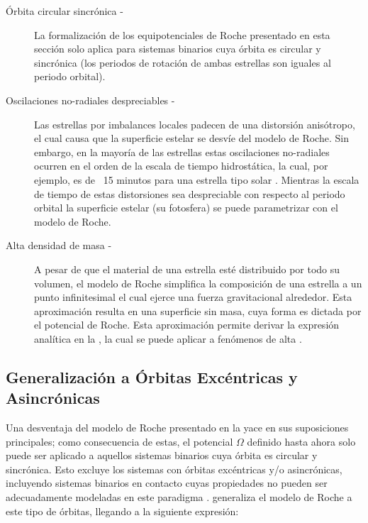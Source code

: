\begin{description}
	\item[Órbita circular sincrónica -] La formalización de los equipotenciales
	de Roche presentado en esta sección solo aplica para sistemas binarios cuya
	órbita es circular y sincrónica (los periodos de rotación de ambas estrellas
	son iguales al periodo orbital). 
	
	
	\item[Oscilaciones no-radiales despreciables -]  Las estrellas por
	imbalances locales padecen de una distorsión anisótropo, el cual causa que
	la superficie estelar se desvíe del modelo de Roche. Sin embargo, en la
	mayoría de las estrellas estas oscilaciones no-radiales ocurren en el orden
	de la escala de tiempo hidrostática, la cual, por ejemplo, es de ~15 minutos
	para una estrella tipo solar
	. Mientras
	la escala de tiempo de estas distorsiones sea despreciable con respecto al
	periodo orbital la superficie estelar (su fotosfera) se puede parametrizar
	con el modelo de Roche.

	\item[Alta densidad de masa -] A pesar de que el material de una estrella
	esté distribuido por todo su volumen, el modelo de Roche simplifica la
	composición de una estrella a un punto infinitesimal el cual ejerce una
	fuerza gravitacional alrededor. Esta aproximación resulta en una superficie
	sin masa, cuya forma es dictada por el potencial de Roche. Esta aproximación
	permite derivar la expresión analítica en la , la
	cual se puede aplicar a fenómenos de alta 
	.
\end{description}

\subsection{Generalización a Órbitas Excéntricas y Asincrónicas}

Una desventaja del modelo de Roche presentado en la 
yace en sus suposiciones principales; como consecuencia de estas, el potencial
$\Omega$ definido hasta ahora solo puede ser aplicado a aquellos sistemas
binarios cuya órbita es circular y sincrónica. Esto excluye los sistemas con
órbitas excéntricas y/o asincrónicas, incluyendo sistemas binarios en contacto
cuyas propiedades no pueden ser adecuadamente modeladas en este paradigma
.
\autocite{wilson_eccentric_1979} generaliza el modelo de Roche a este tipo de
órbitas, llegando a la siguiente expresión:

